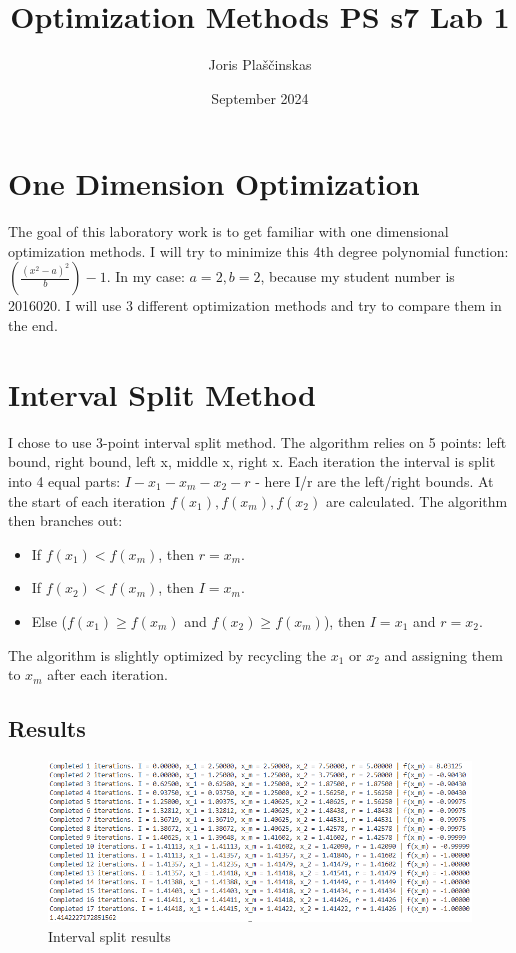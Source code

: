 \documentclass{article}
\title{Optimization Methods PS s7 Lab 1}
\author{Joris Plaščinskas}
\date{September 2024}
\begin{document}
    \maketitle
    \section{One Dimension Optimization}
        The goal of this laboratory work is to get familiar with one dimensional optimization methods. I will try to minimize this 4th degree polynomial function: $(\frac{(x^{2} - a)^{2}}{b}) - 1$. In my case: $a=2,b=2$, because my student number is 2016020. I will use 3 different optimization methods and try to compare them in the end.
    \section{Interval Split Method}
        I chose to use 3-point interval split method. The algorithm relies on 5 points: left bound, right bound, left x, middle x, right x. Each iteration the interval is split into 4 equal parts: $I-x_1-x_m-x_2-r$ - here I/r are the left/right bounds. At the start of each iteration $f(x_1), f(x_m), f(x_2)$ are calculated. The algorithm then branches out:
        \begin{itemize}
            \item If $f(x_1) < f(x_m)$, then $r=x_m$.
            \item If $f(x_2) < f(x_m)$, then $I=x_m$.
            \item Else ($f(x_1) \geq f(x_m)$ and $f(x_2) \geq f(x_m)$), then $I=x_1$ and $r=x_2$.
        \end{itemize}
        The algorithm is slightly optimized by recycling the $x_1$ or $x_2$ and assigning them to $x_m$ after each iteration.
        \subsection*{Results}
            \begin{figure}[H]
                \centering
                \includegraphics[width=1\textwidth]{interval.png}
                \caption{Interval split results}
                \label{fig:ml}
            \end{figure}
\end{document}
